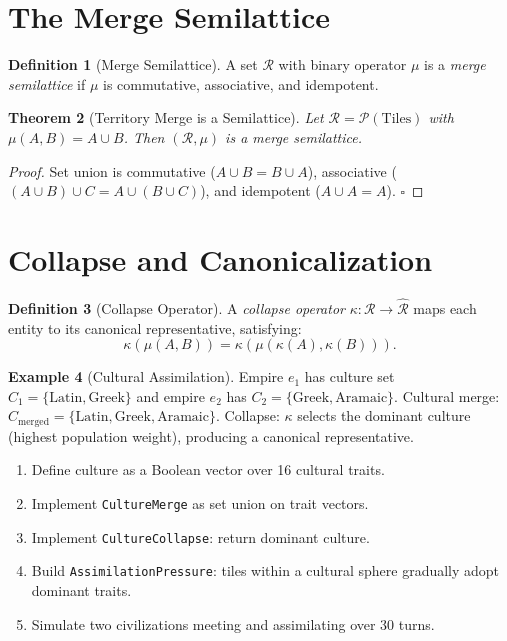 \documentclass[11pt,a4paper,openany]{book}
\theoremstyle{plain}
\newtheorem{theorem}{Theorem}[chapter]
\theoremstyle{definition}
\newtheorem{definition}[theorem]{Definition}
\newtheorem{example}[theorem]{Example}
\theoremstyle{remark}
\newenvironment{project}[1]{%
  \begin{tcolorbox}[
    title={\textbf{Project: #1}},
    colback=projectbg,
    colframe=sphereblue,
    fonttitle=\bfseries\color{white},
    coltitle=white,
    attach boxed title to top left={yshift=-2mm, xshift=4mm},
    boxed title style={colback=sphereblue, sharp corners},
    sharp corners,
    breakable,
    before upper={\normalfont\setlength{\parindent}{0pt}\tolerance=9999\hbadness=9999}
  ]
}{\end{tcolorbox}}
\begin{document}
\section{The Merge Semilattice}

\begin{definition}[Merge Semilattice]
  A set $\mathcal{R}$ with binary operator $\mu$ is a
  \emph{merge semilattice} if $\mu$ is commutative, associative,
  and idempotent.
\end{definition}

\begin{theorem}[Territory Merge is a Semilattice]
  Let $\mathcal{R} = \mathcal{P}(\text{Tiles})$ with $\mu(A,B) = A \cup B$.
  Then $(\mathcal{R}, \mu)$ is a merge semilattice.
\end{theorem}
\begin{proof}
  Set union is commutative ($A \cup B = B \cup A$), associative
  ($(A \cup B) \cup C = A \cup (B \cup C)$), and idempotent
  ($A \cup A = A$). $\square$
\end{proof}

\section{Collapse and Canonicalization}

\begin{definition}[Collapse Operator]
  A \emph{collapse operator} $\kappa : \mathcal{R} \to \widehat{\mathcal{R}}$
  maps each entity to its canonical representative, satisfying:
  \[
    \kappa(\mu(A,B)) = \kappa(\mu(\kappa(A), \kappa(B))).
  \]
\end{definition}

\begin{example}[Cultural Assimilation]
  Empire $e_1$ has culture set $C_1 = \{\text{Latin}, \text{Greek}\}$
  and empire $e_2$ has $C_2 = \{\text{Greek}, \text{Aramaic}\}$.
  Cultural merge: $C_{\mathrm{merged}} = \{\text{Latin}, \text{Greek},
  \text{Aramaic}\}$. Collapse: $\kappa$ selects the dominant culture
  (highest population weight), producing a canonical representative.
\end{example}

\begin{project}{Cultural Assimilation Mechanics}
  \begin{enumerate}
    \item Define culture as a Boolean vector over 16 cultural traits.
    \item Implement \texttt{CultureMerge} as set union on trait vectors.
    \item Implement \texttt{CultureCollapse}: return dominant culture.
    \item Build \texttt{AssimilationPressure}: tiles within a cultural
          sphere gradually adopt dominant traits.
    \item Simulate two civilizations meeting and assimilating over 30 turns.
  \end{enumerate}
\end{project}
\end{document}
